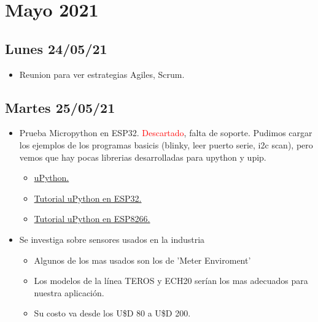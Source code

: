 \section{Mayo 2021}

\subsection*{Lunes 24/05/21}
    \begin{itemize}
        \item Reunion para ver estrategias Agiles, Scrum.
    \end{itemize}

\subsection*{Martes 25/05/21}
    \begin{itemize}
        \item Prueba Micropython en ESP32. \textcolor{red}{Descartado}, falta de soporte. Pudimos cargar los ejemplos de los programas basicis (blinky, leer puerto serie, i2c scan), pero vemos que hay pocas librerias desarrolladas para upython y upip.
            \begin{itemize}
                \item \href{https://micropython.org/download/}{uPython.}
                \item \href{http://docs.micropython.org/en/v1.15/esp32/tutorial/intro.html}{Tutorial uPython en ESP32.}
                \item \href{http://docs.micropython.org/en/v1.15/esp8266/tutorial/index.html#esp8266-tutorial}{Tutorial uPython en ESP8266.}
            \end{itemize}
        \item Se investiga sobre sensores usados en la industria
            \begin{itemize}
                \item Algunos de los mas usados son los de 'Meter Enviroment'
                \item Los modelos de la línea TEROS y ECH20 serían los mas adecuados para nuestra aplicación.
                \item Su costo va desde los U\$D 80 a U\$D 200.
            \end{itemize}
    \end{itemize}

